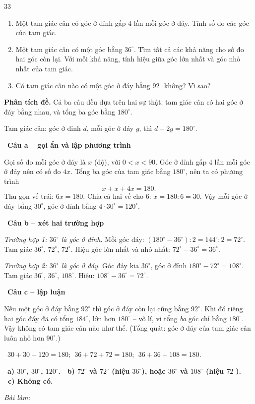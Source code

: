 \documentclass[11pt]{article}
\newif\ifsol \solfalse
\providecommand{\AnsWord}{Đáp số}
\newenvironment{probbox}[2]{\begin{probboxT}{#1}{#2}}{\end{probboxT}}
\newcommand{\StuProb}[2]{\begin{probboxS}{#1}{#2}\StuProbBody\end{probboxS}}
\newcommand{\ans}[1]{\par\smallskip{\bfseries\color{tmGreen!88!black}\AnsWord:}\ {\bfseries\color{AnsRed}#1}\par}
\newcommand{\probsol}[1]{%
  \begin{lrbox}{\solmeasure}\begin{minipage}{\dimexpr\linewidth-24pt\relax}#1\end{minipage}\end{lrbox}%
  \ifsol
    \begin{solbox}#1\end{solbox}%
  \else
    \setlength{\solht}{\dimexpr\ht\solmeasure+\dp\solmeasure+0.85cm\relax}%
    \ifdim\solht<1.35cm\setlength{\solht}{1.35cm}\fi
    \ifdim\solht>\StudentMaxWork\setlength{\solht}{\StudentMaxWork}\fi
    \par\noindent\begin{minipage}{\linewidth}%
    \expandafter\StuProb\StuProbArgs
    \begin{tcolorbox}[colback=white,colframe=Line,boxrule=0.8pt,arc=5pt,
      left=8pt,right=8pt,top=4pt,bottom=4pt,height=\solht]{\footnotesize\color{Slate}\itshape\WorkWord}\end{tcolorbox}%
    \end{minipage}\par\medskip
  \fi}
\newlength{\StudentMaxWork}\setlength{\StudentMaxWork}{4.5cm}
\newcommand{\step}[2]{\par\smallskip\noindent{\bfseries\color{tmBlue!85!black}\StepWord~#1.}\ {\bfseries #2}\par\nopagebreak}
\newcommand{\verify}[1]{\par\smallskip\noindent{\bfseries\color{tmGreen!80!black}\faCheckCircle\ \CheckWord}\ #1\par}
\def\WorkWord{Bài làm:}
\def\AnsWord{Đáp số}
\def\StepWord{Bước}
\def\CheckWord{Thử lại:}
\begin{document}
\begin{probbox}{33}{\relax}
\begin{enumerate}[label=\alph*),leftmargin=1.6em,itemsep=0pt,topsep=0pt]
  \item Một tam giác cân có góc ở đỉnh gấp $4$ lần mỗi góc ở đáy. Tính số đo các góc của tam giác.
  \item Một tam giác cân có một góc bằng $36^\circ$. Tìm tất cả các khả năng cho số đo hai góc còn lại. Với mỗi khả năng, tính hiệu giữa góc lớn nhất và góc nhỏ nhất của tam giác.
  \item Có tam giác cân nào có một góc ở đáy bằng $92^\circ$ không? Vì sao?
\end{enumerate}
\end{probbox}
\probsol{
\textbf{Phân tích đề.} Cả ba câu đều dựa trên hai sự thật: tam giác cân có hai góc ở đáy bằng nhau, và tổng ba góc bằng $180^\circ$.
\begin{recallbox}Tam giác cân: góc ở đỉnh $d$, mỗi góc ở đáy $g$, thì $d+2g=180^\circ$.\end{recallbox}
\step{1}{Câu a -- gọi ẩn và lập phương trình}
Gọi số đo mỗi góc ở đáy là $x$ (độ), với $0<x<90$. Góc ở đỉnh gấp $4$ lần mỗi góc ở đáy nên có số đo $4x$.
Tổng ba góc của tam giác bằng $180^\circ$, nên ta có phương trình
\[ x+x+4x=180. \]
Thu gọn vế trái: $6x=180$. Chia cả hai vế cho $6$: $x=180:6=30$.
Vậy mỗi góc ở đáy bằng $30^\circ$, góc ở đỉnh bằng $4\cdot30^\circ=120^\circ$.

\step{2}{Câu b -- xét hai trường hợp}
\emph{Trường hợp 1: $36^\circ$ là góc ở đỉnh.} Mỗi góc đáy: $(180^\circ-36^\circ):2=144^\circ:2=72^\circ$. Tam giác $36^\circ,\,72^\circ,\,72^\circ$. Hiệu góc lớn nhất và nhỏ nhất: $72^\circ-36^\circ=36^\circ$.

\emph{Trường hợp 2: $36^\circ$ là góc ở đáy.} Góc đáy kia $36^\circ$, góc ở đỉnh $180^\circ-72^\circ=108^\circ$. Tam giác $36^\circ,\,36^\circ,\,108^\circ$. Hiệu: $108^\circ-36^\circ=72^\circ$.

\step{3}{Câu c -- lập luận}
\begin{proofbox}Nếu một góc ở đáy bằng $92^\circ$ thì góc ở đáy còn lại cũng bằng $92^\circ$. Khi đó riêng hai góc đáy đã có tổng $184^\circ$, lớn hơn $180^\circ$ -- vô lí, vì tổng \emph{ba} góc chỉ bằng $180^\circ$. Vậy không có tam giác cân nào như thế. (Tổng quát: góc ở đáy của tam giác cân luôn nhỏ hơn $90^\circ$.)\end{proofbox}
\verify{$30+30+120=180$; $\;36+72+72=180$; $\;36+36+108=180$.}
\ans{a) $30^\circ$, $30^\circ$, $120^\circ$. \ b) $72^\circ$ và $72^\circ$ (hiệu $36^\circ$), hoặc $36^\circ$ và $108^\circ$ (hiệu $72^\circ$). \ c) Không có.}
}
\end{document}
